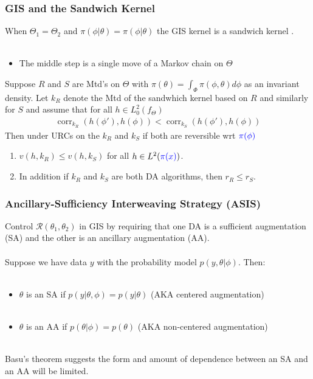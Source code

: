 \documentclass[xcolor=dvipsnames]{beamer}
\DeclareMathOperator{\corr}{corr}
\begin{document}
\begin{frame}
\frametitle{GIS and the Sandwich Kernel}

When $\Theta_1=\Theta_2$ and $\pi(\phi|\theta)=\pi(\phi|\theta)$ the GIS kernel is a sandwich kernel \citep{hobert2008theoretical,hobert2011comment}.\\~\\
\begin{itemize}
\item[] The middle step is a single move of a Markov chain on $\Theta$
\end{itemize}

\begin{theorem}
Suppose $R$ and $S$ are Mtd's on $\Theta$ with $\pi(\theta)=\int_\Phi \pi(\phi,\theta)d\phi$ as an invariant density. Let $k_R$ denote the Mtd of the sandwhich kernel based on $R$ and similarly for $S$ and assume that for all $h\in L^2_0(f_\Theta)$
\begin{align*}
\corr_{k_R}(h(\phi'),h(\phi)) < \corr_{k_S}(h(\phi'),h(\phi))
\end{align*}
Then under URCs on the $k_R$ and $k_S$ if both are reversible wrt ${\color{blue}\pi(\phi)}$ 
\begin{enumerate}
\item $v(h,k_R)\leq v(h,k_S)$ for all $h\in L^2({\color{blue}\pi(x)})$.
\item In addition if $k_R$ and $k_S$ are both DA algorithms, then $r_R\leq r_S$.
\end{enumerate}
\end{theorem}

\end{frame}


\begin{frame}
\frametitle{Ancillary-Sufficiency Interweaving Strategy (ASIS)} 

Control $\mathcal{R}(\theta_1,\theta_2)$ in GIS by requiring that one DA is a sufficient augmentation (SA) and the other is an ancillary augmentation (AA).\\~\\

Suppose we have data $y$ with the probability model $p(y,\theta|\phi)$. Then:\\~
\begin{itemize}
\item$\theta$ is an SA if $p(y|\theta,\phi)=p(y|\theta)$ (AKA centered augmentation)\\~\\
\item$\theta$ is an AA if $p(\theta|\phi)=p(\theta)$ (AKA non-centered augmentation)\\~\\
\end{itemize}
\pause Basu's theorem suggests the form and amount of dependence between an SA and an AA will be limited.
\end{frame}
\end{document}
